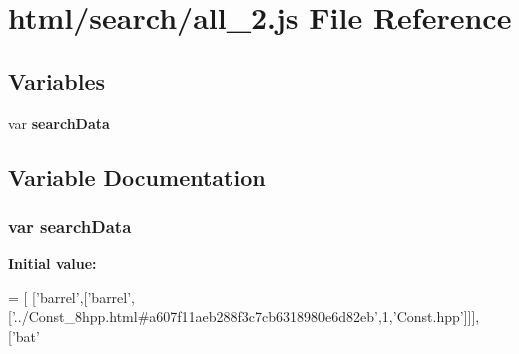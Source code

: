 \section{html/search/all\-\_\-2.js File Reference}
\label{all__2_8js}
\subsection*{Variables}
\begin{DoxyCompactItemize}
\item 
var {\bf search\-Data}
\end{DoxyCompactItemize}


\subsection{Variable Documentation}
\subsubsection[{search\-Data}]{\setlength{\rightskip}{0pt plus 5cm}var search\-Data}\label{all__2_8js_ad01a7523f103d6242ef9b0451861231e}
{\bfseries Initial value\-:}
\begin{DoxyCode}
=
[
  [\textcolor{stringliteral}{'barrel'},[\textcolor{stringliteral}{'barrel'},[\textcolor{stringliteral}{'../Const\_8hpp.html#a607f11aeb288f3c7cb6318980e6d82eb'},1,\textcolor{stringliteral}{'Const.hpp'}]]],
  [\textcolor{stringliteral}{'bat'}
\end{DoxyCode}
